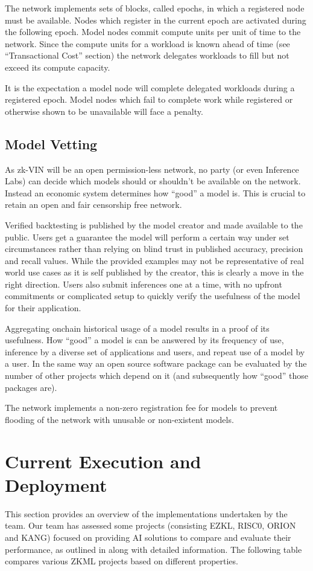 \documentclass[conference]{IEEEtran}
\begin{document}
The network implements sets of blocks, called epochs, in which a registered node must be available. Nodes which register in the current epoch are activated during the following epoch. Model nodes commit compute units per unit of time to the network. Since the compute units for a workload is known ahead of time (see “Transactional Cost” section) the network delegates workloads to fill but not exceed its compute capacity.

It is the expectation a model node will complete delegated workloads during a registered epoch. Model nodes which fail to complete work while registered or otherwise shown to be unavailable will face a penalty.

\subsection{Model Vetting}

As zk-VIN will be an open permission-less network, no party (or even Inference Labs) can decide which models should or shouldn’t be available on the network. Instead an economic system determines how “good” a model is. This is crucial to retain an open and fair censorship free network.

Verified backtesting is published by the model creator and made available to the public. Users get a guarantee the model will perform a certain way under set circumstances rather than relying on blind trust in published accuracy, precision and recall values. While the provided examples may not be representative of real world use cases as it is self published by the creator, this is clearly a move in the right direction. Users also submit inferences one at a time, with no upfront commitments or complicated setup to quickly verify the usefulness of the model for their application.

Aggregating onchain historical usage of a model results in a proof of its usefulness. How “good” a model is can be answered by its frequency of use, inference by a diverse set of applications and users, and repeat use of a model by a user. In the same way an open source software package can be evaluated by the number of other projects which depend on it (and subsequently how “good” those packages are).

The network implements a non-zero registration fee for models to prevent flooding of the network with unusable or non-existent models.


\section{Current Execution and Deployment}
This section provides an overview of the implementations undertaken by the team. Our team has assessed some projects (consisting EZKL, RISC0, ORION and KANG) focused on providing AI solutions to compare and evaluate their performance, as outlined in \cite{BrainbenchXYZ} along with detailed information. The following table compares various ZKML projects based on different properties.
\end{document}
